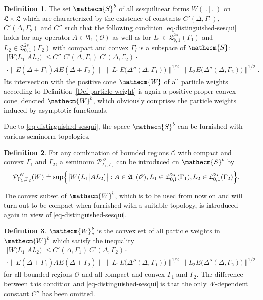 \documentclass[11pt,twoside,openright]{report}
\theoremstyle{definition}
\newtheorem{Def}{Definition}[chapter]
\theoremstyle{plain}
\theoremstyle{remark}
\theoremstyle{assumption}
\newcommand{\Bset}[1]{\Bigl\{ #1 \Bigr\}}
\newcommand{\babs}[1]{\bigl\lvert #1 \bigr\rvert}
\newcommand{\bnorm}[1]{\bigl\lVert #1 \bigr\rVert}
\newcommand{\POG}{\mathcal{P}_{\Gamma_1 , \Gamma_2}^{\; \mathscr{O}}}
\newcommand{\POGx}[1]{\mathcal{P}_{\Gamma_1 , \Gamma_2}^{\;
    \mathscr{O}} ( #1 )}
\newcommand{\Wx}[2]{W ( #1 \vert #2 )}
\newcommand{\bWx}[2]{W \bigl( #1 \big\vert #2 \bigr)}
\newcommand{\Secm}{\mathecm{S}}
\newcommand{\Wecm}{\mathecm{W}}
\newcommand{\Lfrak}{\mathfrak{L}}
\newcommand{\Oscr}{\mathscr{O}}
\newcommand{\EDdGone}{E \bigl( \Delta'' ( \Delta , \Gamma_1 ) \bigr)}
\newcommand{\EDdGtwo}{E \bigl( \Delta'' ( \Delta , \Gamma_2 ) \bigr)}
\newcommand{\EDGoneplus}{E ( \overline{\Delta} + \Gamma_1)}
\newcommand{\EDGtwoplus}{E ( \overline{\Delta} + \Gamma_2)}
\newcommand{\AoneO}{\mathfrak{A}_1 ( \mathscr{O} )}
\begin{document}
\begin{Def}
  \label{Def-weights-subclass}
  The set $\Secm^b$ of all sesquilinear forms $\Wx{~.~}{~.~}$ on
  $\Lfrak \times \Lfrak$ which are characterized by the existence of
  constants $C' ( \Delta , \Gamma_1 )$, $C' ( \Delta , \Gamma_2 )$ and
  $C''$ such that the following condition
  \eqref{eq-distinguished-sesqui} holds for any operator $A \in
  \AoneO$ as well as for $L_1 \in \Lfrak_{0 , 1}^{2 s} ( \Gamma_1 )$
  and $L_2 \in \Lfrak_{0 , 1}^{2 s} ( \Gamma_2 )$ with compact and
  convex $\Gamma_l$ is a subspace of $\Secm$:
  \begin{multline}
    \label{eq-distinguished-sesqui}
    \babs{\bWx{L_1}{A L_2}} \leqslant C'' \; C' ( \Delta , \Gamma_1 )
    \; C' ( \Delta , \Gamma_2 ) \cdot \\
    \cdot \bnorm{\EDGoneplus A \EDGtwoplus} \, \bnorm{L_1 \EDdGone}^{1
    / 2} \bnorm{L_2 \EDdGtwo}^{1 / 2} \text{.}
  \end{multline}
  Its intersection with the positive cone $\Wecm$ of all particle
  weights according to Definition~\ref{Def-particle-weight} is again a
  positive proper convex cone, denoted $\Wecm^b$, which obviously
  comprises the particle weights induced by asymptotic functionals.
\end{Def}
Due to \eqref{eq-distinguished-sesqui}, the space $\Secm^b$ can be
furnished with various seminorm topologies.
\begin{Def}
  \label{Def-sesqui-seminorms}
  For any combination of bounded regions $\Oscr$ with compact and
  convex $\Gamma_1$ and $\Gamma_2$, a seminorm $\POG$ can be introduced
  on $\Secm^b$ by
  \begin{equation}
    \label{eq-Secm-seminorm}
    \POGx{W} \doteq \sup \Bset{\babs{\bWx{L_1}{A L_2}} : A \in \AoneO
    , L_1 \in \Lfrak_{0 , 1}^{2 s} ( \Gamma_1 ) , L_2 \in \Lfrak_{0 ,
    1}^{2 s} ( \Gamma_2 )} \text{.}
  \end{equation}
\end{Def}
The convex subset of $\Wecm^b$, which is to be used from now on and
will turn out to be compact when furnished with a suitable topology, 
is introduced again in view of \eqref{eq-distinguished-sesqui}.
\begin{Def}
  $\Wecm_c^b$ is the convex set of all particle weights in $\Wecm^b$
  which satisfy the inequality
  \begin{multline}
    \label{eq-def-convex-set-weights}
    \babs{\bWx{L_1}{A L_2}} \leqslant C' ( \Delta , \Gamma_1 ) \; C' (
    \Delta , \Gamma_2 ) \cdot \\
    \cdot \bnorm{\EDGoneplus A \EDGtwoplus} \, \bnorm{L_1 \EDdGone}^{1
    / 2} \bnorm{L_2 \EDdGtwo}^{1 / 2}  
  \end{multline}
  for all bounded regions $\Oscr$ and all compact and convex
  $\Gamma_1$ and $\Gamma_2$. The difference between this condition and
  \eqref{eq-distinguished-sesqui} is that the only $W$-dependent
  constant $C''$ has been omitted.
\end{Def}
\end{document}
